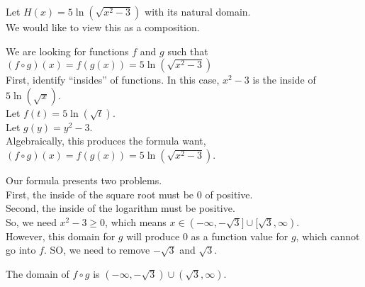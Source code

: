 \documentclass{ximera}
\begin{document}
\begin{example}


Let $H(x) = 5 \ln(\sqrt{x^2-3})$ with its natural domain. \\


We would like to view this as a composition. \\



\begin{explanation}


We are looking for functions $f$ and $g$ such that $(f \circ g)(x) = f(g(x)) = 5 \ln(\sqrt{x^2-3})$ \\


First, identify ``insides'' of functions.  In this case, $x^2 - 3$ is the inside of $5 \ln(\sqrt{x})$. \\




Let $f(t) = 5 \ln(\sqrt{t})$. \\

Let $g(y) = y^2 - 3$. \\


Algebraically, this produces the formula want, $(f \circ g)(x) = f(g(x)) = 5 \ln(\sqrt{x^2-3})$.








\end{explanation}


\begin{observation}

Our formula presents two problems.\\

First, the inside of the square root must be $0$ of positive.\\

Second, the inside of the logarithm must be positive. \\



So, we need $x^2 - 3 \geq 0 $, which means $x \in (-\infty, -\sqrt{3}] \cup [\sqrt{3}, \infty)$. \\


However, this domain for $g$ will produce $0$ as a function value for $g$, which cannot go into $f$.  SO, we need to remove $-\sqrt{3}$ and $\sqrt{3}$.




The domain of $f \circ g$ is $(-\infty, -\sqrt{3}) \cup (\sqrt{3}, \infty)$.




\end{observation}


\end{example}
\end{document}
